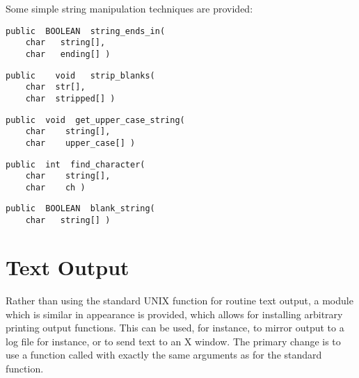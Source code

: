 Some simple string manipulation techniques are provided:

{\bf\begin{verbatim}
public  BOOLEAN  string_ends_in(
    char   string[],
    char   ending[] )
\end{verbatim}}


{\bf\begin{verbatim}
public    void   strip_blanks(
    char  str[],
    char  stripped[] )
\end{verbatim}}


{\bf\begin{verbatim}
public  void  get_upper_case_string(
    char    string[],
    char    upper_case[] )
\end{verbatim}}


{\bf\begin{verbatim}
public  int  find_character(
    char    string[],
    char    ch )
\end{verbatim}}


{\bf\begin{verbatim}
public  BOOLEAN  blank_string(
    char   string[] )
\end{verbatim}}


\section{Text Output}

Rather than using the standard UNIX function  for routine
text output, a module which is similar in appearance is provided,
which allows for installing arbitrary printing output functions.  This
can be used, for instance, to mirror output to a log file for
instance, or to send text to an X window.  The primary change is to
use a function called  with exactly the same arguments as
for the standard  function.


